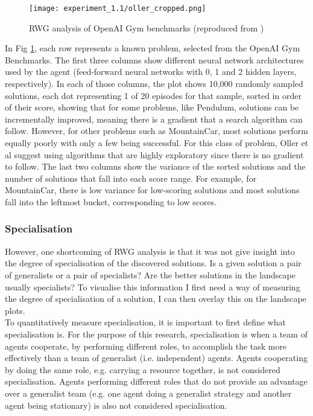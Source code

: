 \documentclass[12pt]{article}
\begin{document}
\begin{figure}
	\centering
	\texttt{[image: experiment\_1.1/oller\_cropped.png]}
	\caption{RWG analysis of OpenAI Gym benchmarks (reproduced from \cite{oller:AAMAS:2020})}
	\label{fig:oller}
\end{figure}

In Fig \ref{fig:oller}, each row represents a known problem, selected from the OpenAI Gym Benchmarks.
The first three columns show different neural network architectures used by the agent (feed-forward neural networks with 0, 1 and 2 hidden layers, respectively).
In each of those columns, the plot shows 10,000 randomly sampled solutions, each dot representing 1 of 20 episodes for that sample, sorted in order of their score, showing that for some problems, like Pendulum, solutions can be incrementally improved, meaning there is a gradient that a search algorithm can follow.
However, for other problems such as MountainCar, most solutions perform equally poorly with only a few being successful.
For this class of problem, Oller et al suggest using algorithms that are highly exploratory since there is no gradient to follow.
The last two columns show the variance of the sorted solutions and the number of solutions that fall into each score range.
For example, for MountainCar, there is low variance for low-scoring solutions and most solutions fall into the leftmost bucket, corresponding to low scores.\\

\subsubsection{Specialisation}

However, one shortcoming of RWG analysis is that it was not give insight into the degree of specialisation of the discovered solutions.
Is a given solution a pair of generalists or a pair of specialists? 
Are the better solutions in the landscape usually specialists? 
To visualise this information I first need a way of measuring the degree of specialisation of a solution, I can then overlay this on the landscape plots.\\

To quantitatively measure specialisation, it is important to first define what specialisation is.
For the purpose of this research, specialisation is when a team of agents cooperate, by performing different roles, to accomplish the task more effectively than a team of generalist (i.e. independent) agents.
Agents cooperating by doing the same role, e.g. carrying a resource together, is not considered specialisation.
Agents performing different roles that do not provide an advantage over a generalist team (e.g. one agent doing a generalist strategy and another agent being stationary) is also not considered specialisation.\\
\end{document}
